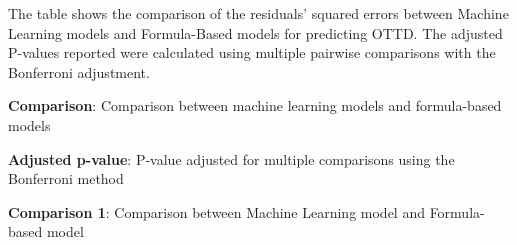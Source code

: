 \documentclass[11pt]{article}
\begin{document}
\begin{table}[h]
\caption{Comparative Analysis between Machine Learning Models and Formula-Based Models}
\label{table:ml_vs_formula}
\begin{threeparttable}
\renewcommand{\TPTminimum}{\linewidth}
\begin{tablenotes}
\footnotesize
\item The table shows the comparison of the residuals' squared errors between Machine Learning models and Formula-Based models for predicting OTTD. The adjusted P-values reported were calculated using multiple pairwise comparisons with the Bonferroni adjustment.
\item \textbf{Comparison}: Comparison between machine learning models and formula-based models
\item \textbf{Adjusted p-value}: P-value adjusted for multiple comparisons using the Bonferroni method
\item \textbf{Comparison 1}: Comparison between Machine Learning model and Formula-based model

\end{tablenotes}
\end{threeparttable}
\end{table}
\end{document}
